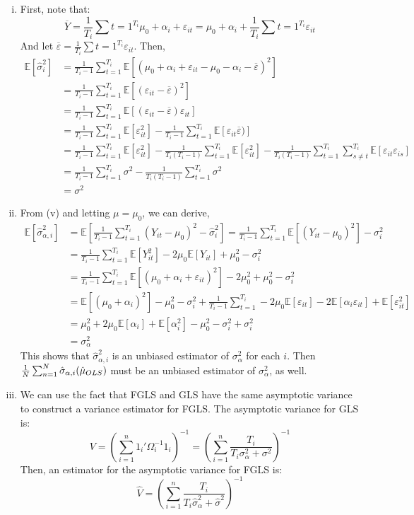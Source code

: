 \documentclass{article}
\newcommand{\est}[1]{\frac{1}{\uppercase{#1}}\sum_{\lowercase{#1}=1}^{\uppercase{#1}}}
\newcommand{\sumn}{\sum_{i=1}^{n}}
\newcommand{\eps}{\varepsilon}
\newcommand{\esti}{\frac{1}{T_i-1}\sum_{t=1}^{T_i}}
\newcommand{\E}[1]{\mathbb{E}\left[#1\right]}%
\begin{document}
\begin{enumerate}[(i)]
	
	\item First, note that:
		\[
			\overline{Y} = \frac{1}{T_i}\sum{t=1}^{T_i}\mu_0 + \alpha_i + \varepsilon_{it} = \mu_0 + \alpha_i + \frac{1}{T_i}\sum{t=1}^{T_i}\varepsilon_{it}
		\]
		And let $\overline{\varepsilon} = \frac{1}{T_i}\sum{t=1}^{T_i}\varepsilon_{it}$. Then,
		\begin{align*}
			\E{\hat{\sigma}_i^2} 	&= \frac{1}{T_i-1}\sum_{t=1}^{T_i}\E{(\mu_0 + \alpha_i + \eps_{it}-\mu_0 - \alpha_i - \overline{\eps})^2}	\\
									&= \frac{1}{T_i-1}\sum_{t=1}^{T_i}\E{(\eps_{it} - \overline{\eps})^2}										\\
									&= \frac{1}{T_i-1}\sum_{t=1}^{T_i}\E{(\eps_{it} - \overline{\eps})\eps_{it}}								\\
									&= \frac{1}{T_i-1}\sum_{t=1}^{T_i}\E{\eps_{it}^2} - \esti\E{\eps_{it}\overline{\eps})}						\\
									&= \frac{1}{T_i-1}\sum_{t=1}^{T_i}\E{\eps_{it}^2} - \frac{1}{T_i(T_i-1)}\sum_{t=1}^{T_i}\E{\eps_{it}^2}
										- \frac{1}{T_i(T_i-1)}\sum_{t=1}^{T_i}\sum_{s\neq t}^{T_i}\E{\eps_{it}\eps_{is}}						\\
									&= \frac{1}{T_i-1}\sum_{t=1}^{T_i}\sigma^2 - \frac{1}{T_i(T_i-1)}\sum_{t=1}^{T_i}\sigma^2					\\
									&= \sigma^2
		\end{align*}
	
	
	\item From (v) and letting $\mu=\mu_0$, we can derive,
		{\small \begin{align*}
			\E{\hat{\sigma}_{\alpha,i}^2} 	
					&= \E{\esti(Y_{it}-\mu_0)^2-\hat{\sigma}_i^2} = \esti\E{(Y_{it}-\mu_0)^2}-\sigma_i^2										\\
					&= \esti \E{Y_{it}^2} - 2\mu_0\E{Y_{it}} + \mu_0^2 - \sigma_i^2 															\\
					&= \esti \E{(\mu_0 + \alpha_i + \eps_{it})^2} - 2\mu_0^2 + \mu_0^2 - \sigma_i^2 											\\
					&= \E{(\mu_0 + \alpha_i)^2} - \mu_0^2  - \sigma_i^2  + \esti -2\mu_0\E{\eps_{it}}- 2\E{\alpha_i\eps_{it}}+\E{\eps_{it}^2}	\\
					&= \mu_0^2 + 2\mu_0\E{\alpha_i} + \E{\alpha_i^2} - \mu_0^2 - \sigma_i^2 + \sigma_i^2										\\
					&= \sigma_\alpha^2
		\end{align*} }
		This shows that $\hat{\sigma}_{\alpha,i}^2$ is an unbiased estimator of $\sigma_\alpha^2$ for each $i$. Then ${\est{n}\hat{\sigma}_{\alpha,i}(\hat{\mu}_{OLS})}$ must be an unbiased estimator of $\sigma_\alpha^2$, as well.
		
	\pagebreak
	\item We can use the fact that FGLS and GLS have the same asymptotic variance to construct a variance estimator for FGLS. The asymptotic variance for GLS is:
		\[
			V = \left(\sumn 1_i'\Omega_i^{-1}1_i\right)^{-1} = \left(\sumn\frac{T_i}{T_i\sigma^2_\alpha+\sigma^2}\right)^{-1}
		\]
		Then, an estimator for the asymptotic variance for FGLS is:
		\[
			\hat{V} = \left(\sumn\frac{T_i}{T_i\hat{\sigma}_\alpha^2+\hat{\sigma}^2}\right)^{-1}
		\]
	
	
\end{enumerate}
\end{document}
